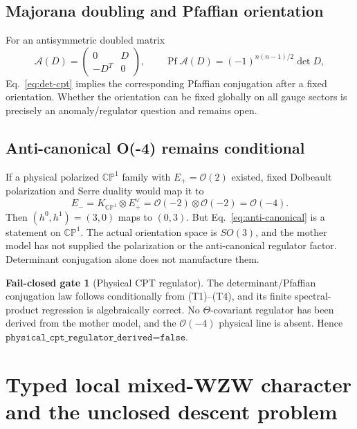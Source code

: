 \documentclass[11pt]{article}
\theoremstyle{definition}
\newtheorem{gate}[theorem]{Fail-closed gate}
\theoremstyle{remark}
\newcommand{\CP}{\mathbb {CP}}
\newcommand{\cO}{\mathcal O}
\newcommand{\Pf}{\operatorname{Pf}}
\begin{document}
\subsection{Majorana doubling and Pfaffian orientation}

For an antisymmetric doubled matrix
\begin{equation}
 \mathcal A(D)=
 \begin{pmatrix}0&D\\-D^T&0\end{pmatrix},
 \qquad
 \Pf\mathcal A(D)=(-1)^{n(n-1)/2}\det D,
 \label{eq:pf-doubling}
\end{equation}
Eq.~\eqref{eq:det-cpt} implies the corresponding Pfaffian conjugation after a
fixed orientation.  Whether the orientation can be fixed globally on all
gauge sectors is precisely an anomaly/regulator question and remains open.

\subsection{Anti-canonical O(-4) remains conditional}

If a physical polarized \(\CP^1\) family with \(E_+=\cO(2)\) existed, fixed
Dolbeault polarization and Serre duality would map it to
\begin{equation}
 E_-=K_{\CP^1}\otimes E_+^\vee
 =\cO(-2)\otimes\cO(-2)=\cO(-4).
 \label{eq:anti-canonical}
\end{equation}
Then \((h^0,h^1)=(3,0)\) maps to \((0,3)\).  But
Eq.~\eqref{eq:anti-canonical} is a statement on \(\CP^1\).  The actual
orientation space is \(SO(3)\), and the mother model has not supplied the
polarization or the anti-canonical regulator factor.  Determinant
conjugation alone does not manufacture them.

\begin{gate}[Physical CPT regulator]
The determinant/Pfaffian conjugation law follows conditionally from
(T1)--(T4), and its finite spectral-product regression is algebraically
correct.  No \(\Theta\)-covariant regulator has been derived from the mother
model, and the \(\cO(-4)\) physical line is absent.  Hence
\(\texttt{physical\_cpt\_regulator\_derived=false}\).
\end{gate}

\section{Typed local mixed-WZW character and the unclosed descent problem}
\end{document}
